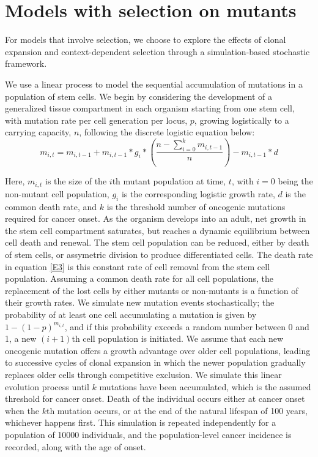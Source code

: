 \documentclass[9pt,onecolumn,twoside]{pnas-new}
\begin{document}
\section*{Models with selection on mutants}
For models that involve selection, we choose to explore the effects of clonal expansion and context-dependent selection through a simulation-based stochastic framework. 

We use a linear process to model the sequential accumulation of mutations in a population of stem cells. We begin by considering the development of a generalized tissue compartment in each organism starting from one stem cell, with mutation rate per cell generation per locus, $p$, growing logistically to a carrying capacity, $n$, following the discrete logistic equation below:
\begin{equation}
	m_{i, t} = m_{i, t-1} + m_{i, t-1}*g_{i}*(\dfrac{n-\sum_{i=0}^{k} m_{i, t-1}}{n}) - m_{i, t-1}*d
	\label{E3}	
\end{equation}

Here, $m_{i, t}$ is the size of the $i$th mutant population at time, $t$, with $i=0$ being the non-mutant cell population, $g_{i}$ is the corresponding logistic growth rate, $d$ is the common death rate, and $k$ is the threshold number of oncogenic mutations required for cancer onset. As the organism develops into an adult, net growth in the stem cell compartment saturates, but reaches a dynamic equilibrium between cell death and renewal. The stem cell population can be reduced, either by death of stem cells, or assymetric division to produce differentiated cells. The death rate in equation \ref{E3} is this constant rate of cell removal from the stem cell population. Assuming a common death rate for all cell populations, the replacement of the lost cells by either mutants or non-mutants is a function of their growth rates. We simulate new mutation events stochastically; the probability of at least one cell accumulating a mutation is given by $1-(1-p)^{m_{i, t}}$, and if this probability exceeds a random number between 0 and 1, a new $(i+1)$th cell population is initiated. We assume that each new oncogenic mutation offers a growth advantage over older cell populations, leading to successive cycles of clonal expansion in which the newer population gradually replaces older cells through competitive exclusion. We simulate this linear evolution process until $k$ mutations have been accumulated, which is the assumed threshold for cancer onset. Death of the individual occurs either at cancer onset when the $k$th mutation occurs, or at the end of the natural lifespan of 100 years, whichever happens first. This simulation is repeated independently for a population of 10000 individuals, and the population-level cancer incidence is recorded, along with the age of onset.
\end{document}
